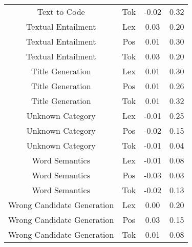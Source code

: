 \begin{table}
\begin{tabular}{cccc}
Text to Code & Tok & -0.02 & 0.32 \\
Textual Entailment & Lex & 0.03 & 0.20 \\
Textual Entailment & Pos & 0.01 & 0.30 \\
Textual Entailment & Tok & 0.03 & 0.20 \\
Title Generation & Lex & 0.01 & 0.30 \\
Title Generation & Pos & 0.01 & 0.26 \\
Title Generation & Tok & 0.01 & 0.32 \\
Unknown Category & Lex & -0.01 & 0.25 \\
Unknown Category & Pos & -0.02 & 0.15 \\
Unknown Category & Tok & -0.01 & 0.04 \\
Word Semantics & Lex & -0.01 & 0.08 \\
Word Semantics & Pos & -0.03 & 0.03 \\
Word Semantics & Tok & -0.02 & 0.13 \\
Wrong Candidate Generation & Lex & 0.00 & 0.20 \\
Wrong Candidate Generation & Pos & 0.03 & 0.15 \\
Wrong Candidate Generation & Tok & 0.01 & 0.08 \\
\bottomrule
\end{tabular}
\end{table}
